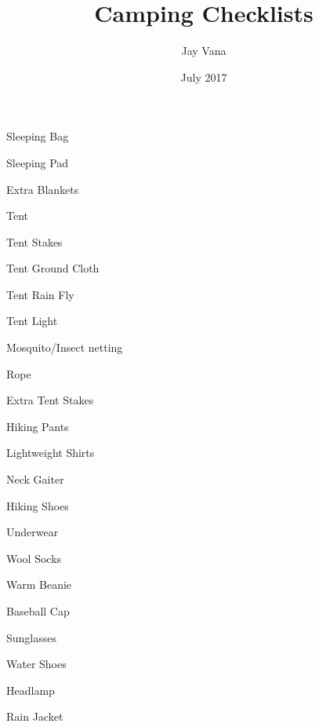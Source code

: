 \documentclass{article}
\title{Camping Checklists}
\author{Jay Vana}
\date{July 2017}
\begin{document}
  


  \begin{multicols*}{3}



    \begin{packlist}
      \item Sleeping Bag
      \item Sleeping Pad
      \item Extra Blankets
    \end{packlist}


    \begin{packlist}
      \item Tent
      \item Tent Stakes
      \item Tent Ground Cloth
      \item Tent Rain Fly
      \item Tent Light
      \item Mosquito/Insect netting
      \item Rope
      \item Extra Tent Stakes
    \end{packlist}


    \begin{packlist}
      \item Hiking Pants
      \item Lightweight Shirts
      \item Neck Gaiter
      \item Hiking Shoes
      \item Underwear
      \item Wool Socks
      \item Warm Beanie
      \item Baseball Cap
      \item Sunglasses
      \item Water Shoes
      \item Headlamp
      \item Rain Jacket
    \end{packlist}



\end{multicols*}
\end{document}
